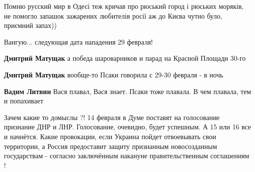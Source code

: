 \begin{itemize}
\begin{itemize}
Помню русский мир в Одесі теж кричав про рюський город і рюських моряків, не
помогло запашок зажарених любителів росії аж до Києва чутно було, приємний
запах))

\end{itemize} %

Вангую... следующая дата нападения 29 февраля!

\begin{itemize} %
\textbf{Дмитрий Матущак} а победа шароварников и парад на Красной Площади 30-го

\textbf{Дмитрий Матущак} вообще-то Псаки говорила с 29-30 февраля - в ночь

\textbf{Вадим Литвин} Вася плавал, Вася знает. Псаки тоже плавала. В чем плавала, тем и попахивает
\end{itemize} %


Зачем какие то домыслы ?! 14 февраля в Думе поставят на голосование признание
ДНР и ЛНР. Голосование, очевидно, будет успешным. А 15 или 16 все и начнётся.
Какие провокации, если Украина пойдет отвоевывать свои территории, а Россия
предоставит защиту признанным новосозданным государствам - согласно заключённым
накануне правительственным соглашениям !

\end{itemize} %
